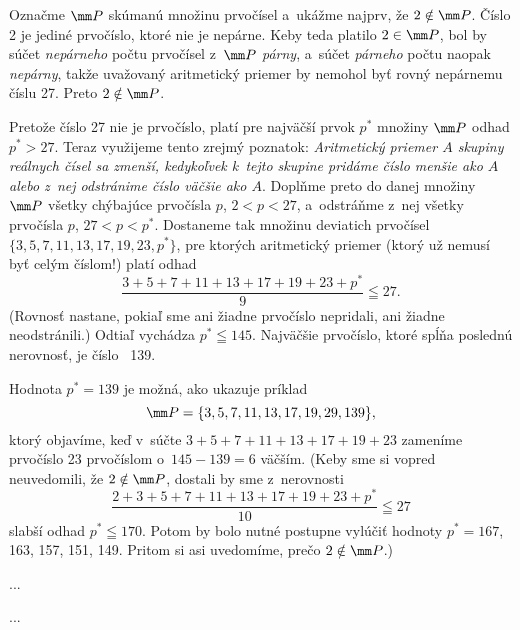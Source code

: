 {%
Označme $\mm P$ skúmanú množinu prvočísel a~ukážme
najprv, že $2\notin\mm P$. Číslo 2 je jediné prvočíslo, ktoré nie je
nepárne. Keby teda platilo $2\in\mm P$, bol by
súčet {\it nepárneho\/} počtu prvočísel z~$\mm P$ {\it párny},
a~súčet {\it párneho\/} počtu naopak {\it nepárny}, takže uvažovaný
aritmetický priemer
by nemohol byť rovný nepárnemu číslu 27.
Preto $2\notin\mm P$.

Pretože číslo 27 nie je prvočíslo, platí pre najväčší prvok $p^\ast$
množiny $\mm P$ odhad $p^\ast>27$. Teraz využijeme tento zrejmý poznatok:
{\it Aritmetický priemer $A$ skupiny reálnych čísel sa zmenší,
kedykoľvek k~tejto skupine pridáme číslo menšie ako $A$ alebo
z~nej odstránime číslo väčšie ako $A$}. Doplňme preto do danej množiny
$\mm P$ všetky chýbajúce prvočísla $p$, $2<p<27$, a~odstráňme z~nej
všetky prvočísla $p$, $27<p<p^\ast$. Dostaneme tak množinu deviatich
prvočísel $\{3,5,7,11,13,17,19,23,p^\ast\}$, pre ktorých aritmetický priemer
(ktorý už nemusí byť celým číslom!) platí odhad
$$
\frac{3+5+7+11+13+17+19+23+p^*}{9}\leqq27.
$$
(Rovnosť nastane, pokiaľ sme ani žiadne prvočíslo nepridali, ani
žiadne neodstránili.)  Odtiaľ vychádza $p^\ast\leqq145$.
Najväčšie prvočíslo, ktoré spĺňa poslednú nerovnosť, je číslo~ 139.

Hodnota $p^\ast=139$ je možná, ako ukazuje príklad
$$
\mm P=\{3,5,7,11,13,17,19,29,139\},
$$
ktorý objavíme, keď v~súčte $3+5+7+11+13+17+19+23$ zameníme
prvočíslo 23 prvočíslom o~$145-139=6$ väčším. (Keby sme si vopred
neuvedomili, že $2\notin\mm P$, dostali by sme z~nerovnosti
$$
\frac{2+3+5+7+11+13+17+19+23+p^*}{10}\leqq27
$$
slabší odhad $p^*\leqq170$. Potom by bolo nutné postupne
vylúčiť hodnoty $p^\ast=167$, 163, 157, 151, 149. Pritom si asi
uvedomíme, prečo $2\notin\mm P$.)
}

{%
...}

{%
...}


